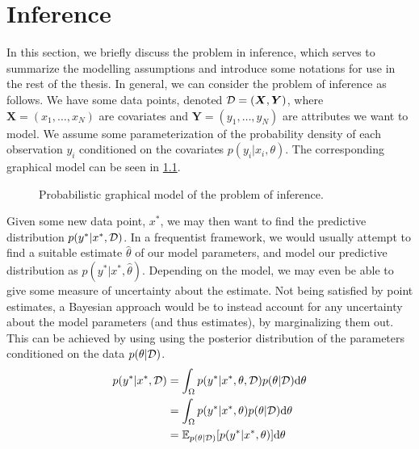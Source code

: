 \chapter{Inference}

In this section, we briefly discuss the problem in inference, which serves to summarize the modelling assumptions and introduce some notations for use in the rest of the thesis. 
In general, we can consider the problem of inference as follows.
We have some data points, denoted $\mathcal{D} = (\bm{X}, \bm{Y})$, where $\bm{X} = (x_1,\dots,x_N)$ are covariates and $\bm{Y} = (y_1, \dots, y_N)$ are attributes we want to model. 
We assume some parameterization of the probability density of each observation $y_i$ conditioned on the covariates $p(y_i|x_i,\theta)$.
The corresponding graphical model can be seen in \cref{fig:pgm}. 
\begin{figure}[htbp]
    \centering
    \caption{Probabilistic graphical model of the problem of inference.}
    \label{fig:pgm}
\end{figure}
Given some new data point, $x^\ast$, we may then want to find the predictive distribution $p(y^\ast | x^\ast, \mathcal{D})$. 
In a frequentist framework, we would usually attempt to find a suitable estimate $\hat{\theta}$ of our model parameters, and model our predictive distribution as $p(y^\ast | x^\ast, \hat{\theta})$.
Depending on the model, we may even be able to give some measure of uncertainty about the estimate.
Not being satisfied by point estimates, a Bayesian approach would be to instead account for any uncertainty about the model parameters (and thus estimates), by marginalizing them out. 
This can be achieved by using using the posterior distribution of the parameters conditioned on the data $p(\theta|\mathcal{D})$.
\begin{equation}\label{eq:inference}
    \begin{aligned}
        p(y^\ast | x^\ast, \mathcal{D}) &= \int_{\Omega} p(y^\ast | x^\ast, \theta, \mathcal{D})  p(\theta|\mathcal{D}) \dd\theta \\
        &= \int_{\Omega} p(y^\ast | x^\ast, \theta)  p(\theta|\mathcal{D}) \dd\theta\\
        &= \operatorname{\mathbb{E}}_{p(\theta|\mathcal{D})} [p(y^\ast | x^\ast, \theta)]  \dd\theta
    \end{aligned}
\end{equation}
